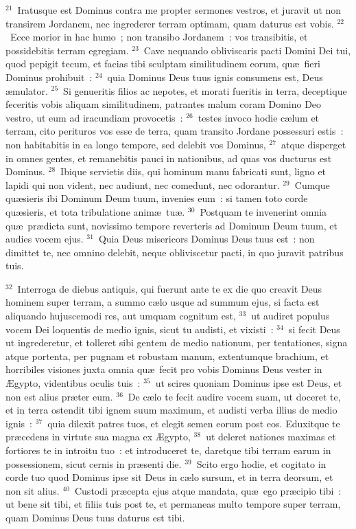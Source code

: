 ${}^{21}$~Iratusque est Dominus contra me propter sermones vestros, et juravit ut non transirem Jordanem, nec ingrederer terram optimam, quam daturus est vobis.
${}^{22}$~Ecce morior in hac humo~; non transibo Jordanem~: vos transibitis, et possidebitis terram egregiam.
${}^{23}$~Cave nequando obliviscaris pacti Domini Dei tui, quod pepigit tecum, et facias tibi sculptam similitudinem eorum, qu\ae\ fieri Dominus prohibuit~:
${}^{24}$~quia Dominus Deus tuus ignis consumens est, Deus \ae mulator.
${}^{25}$~Si genueritis filios ac nepotes, et morati fueritis in terra, deceptique feceritis vobis aliquam similitudinem, patrantes malum coram Domino Deo vestro, ut eum ad iracundiam provocetis~:
${}^{26}$~testes invoco hodie c\ae lum et terram, cito perituros vos esse de terra, quam transito Jordane possessuri estis~: non habitabitis in ea longo tempore, sed delebit vos Dominus,
${}^{27}$~atque disperget in omnes gentes, et remanebitis pauci in nationibus, ad quas vos ducturus est Dominus.
${}^{28}$~Ibique servietis diis, qui hominum manu fabricati sunt, ligno et lapidi qui non vident, nec audiunt, nec comedunt, nec odorantur.
${}^{29}$~Cumque qu\ae sieris ibi Dominum Deum tuum, invenies eum~: si tamen toto corde qu\ae sieris, et tota tribulatione anim\ae\ tu\ae .
${}^{30}$~Postquam te invenerint omnia qu\ae\ pr\ae dicta sunt, novissimo tempore reverteris ad Dominum Deum tuum, et audies vocem ejus.
${}^{31}$~Quia Deus misericors Dominus Deus tuus est~: non dimittet te, nec omnino delebit, neque obliviscetur pacti, in quo juravit patribus tuis.


${}^{32}$~Interroga de diebus antiquis, qui fuerunt ante te ex die quo creavit Deus hominem super terram, a summo c\ae lo usque ad summum ejus, si facta est aliquando hujuscemodi res, aut umquam cognitum est,
${}^{33}$~ut audiret populus vocem Dei loquentis de medio ignis, sicut tu audisti, et vixisti~:
${}^{34}$~si fecit Deus ut ingrederetur, et tolleret sibi gentem de medio nationum, per tentationes, signa atque portenta, per pugnam et robustam manum, extentumque brachium, et horribiles visiones juxta omnia qu\ae\ fecit pro vobis Dominus Deus vester in \AE gypto, videntibus oculis tuis~:
${}^{35}$~ut scires quoniam Dominus ipse est Deus, et non est alius pr\ae ter eum.
${}^{36}$~De c\ae lo te fecit audire vocem suam, ut doceret te, et in terra ostendit tibi ignem suum maximum, et audisti verba illius de medio ignis~:
${}^{37}$~quia dilexit patres tuos, et elegit semen eorum post eos. Eduxitque te pr\ae cedens in virtute sua magna ex \AE gypto,
${}^{38}$~ut deleret nationes maximas et fortiores te in introitu tuo~: et introduceret te, daretque tibi terram earum in possessionem, sicut cernis in pr\ae senti die.
${}^{39}$~Scito ergo hodie, et cogitato in corde tuo quod Dominus ipse sit Deus in c\ae lo sursum, et in terra deorsum, et non sit alius.
${}^{40}$~Custodi pr\ae cepta ejus atque mandata, qu\ae\ ego pr\ae cipio tibi~: ut bene sit tibi, et filiis tuis post te, et permaneas multo tempore super terram, quam Dominus Deus tuus daturus est tibi.


